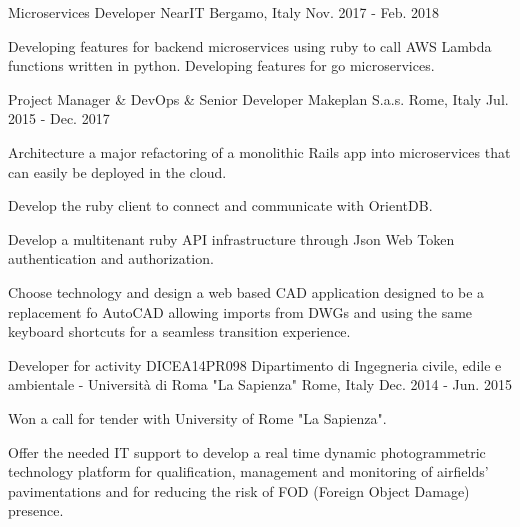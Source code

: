 \begin{cventries}
  \cventry
    {Microservices Developer} %
    {NearIT} %
    {Bergamo, Italy} %
    {Nov. 2017 - Feb. 2018} %
    {
      \begin{cvitems} %
        \item {Developing features for backend microservices using ruby to call AWS Lambda functions written in python. Developing features for go microservices.}
      \end{cvitems}
    }

  \cventry
    {Project Manager \& DevOps \& Senior Developer} %
    {Makeplan S.a.s.} %
    {Rome, Italy} %
    {Jul. 2015 - Dec. 2017} %
    {
      \begin{cvitems} %
        \item {Architecture a major refactoring of a monolithic Rails app into microservices that can easily be deployed in the cloud.}
        \item {Develop the ruby client to connect and communicate with OrientDB.}
        \item {Develop a multitenant ruby API infrastructure through Json Web Token authentication and authorization.}
        \item {Choose technology and design a web based CAD application designed to be a replacement fo AutoCAD allowing imports from DWGs and using the same keyboard shortcuts for a seamless transition experience.}
      \end{cvitems}
    }

  \cventry
    {Developer for activity DICEA14PR098} %
    {Dipartimento di Ingegneria civile, edile e ambientale - Università di Roma "La Sapienza"} %
    {Rome, Italy} %
    {Dec. 2014 - Jun. 2015} %
    {
      \begin{cvitems} %
        \item {Won a call for tender with University of Rome "La Sapienza".}
        \item {Offer the needed IT support to develop a real time dynamic photogrammetric technology platform for qualification, management and monitoring of airfields' pavimentations and for reducing the risk of FOD (Foreign Object Damage) presence.}
      \end{cvitems}
    }


\end{cventries}
